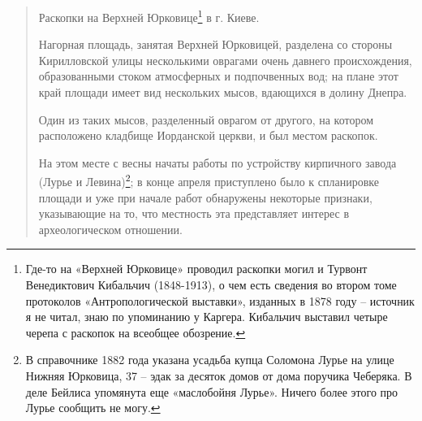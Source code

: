 \begin{quotation}
Раскопки на Верхней Юрковице\footnote{Где-то на «Верхней Юрковице» проводил раскопки могил и Турвонт Венедиктович Кибальчич (1848-1913), о чем есть сведения во втором томе протоколов «Антропологической выставки», изданных в 1878 году – источник я не читал, знаю по упоминанию у Каргера. Кибальчич выставил четыре черепа с раскопок на всеобщее обозрение.} в г. Киеве.

Нагорная площадь, занятая Верхней Юрковицей, разделена со стороны Кирилловской улицы несколькими оврагами очень давнего происхождения, образованными стоком атмосферных и подпочвенных вод; на плане этот край площади имеет вид нескольких мысов, вдающихся в долину Днепра.

Один из таких мысов, разделенный оврагом от другого, на котором расположено кладбище Иорданской церкви, и был местом раскопок. 

На этом месте с весны начаты работы по устройству кирпичного завода (Лурье и Левина)\footnote{В справочнике 1882 года указана усадьба купца Соломона Лурье на улице Нижняя Юрковица, 37 – эдак за десяток домов от дома поручика Чеберяка. В деле Бейлиса упомянута еще «маслобойня Лурье». Ничего более этого про Лурье сообщить не могу.}; в конце апреля приступлено было к спланировке площади и уже при начале работ обнаружены некоторые признаки, указывающие на то, что местность эта представляет интерес в археологическом отношении.


\end{quotation}
